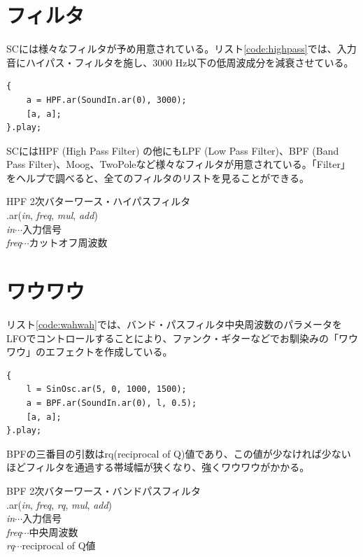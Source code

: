 \documentclass{jsarticle}
\begin{document}
\section{フィルタ}
SCには様々なフィルタが予め用意されている。リスト\ref{code:highpass}では、入力音にハイパス・フィルタを施し、3000 Hz以下の低周波成分を減衰させている。

\begin{lstlisting}[caption=ハイパス・フィルタ, label=code:highpass]
{
	a = HPF.ar(SoundIn.ar(0), 3000);
	[a, a];
}.play;
\end{lstlisting}

SCにはHPF (High Pass Filter) の他にもLPF (Low Pass Filter)、BPF (Band Pass Filter)、Moog、TwoPoleなど様々なフィルタが用意されている。「Filter」をヘルプで調べると、全てのフィルタのリストを見ることができる。

\begin{itembox}[l]{HPF}
{\footnotesize 
2次バターワース・ハイパスフィルタ\\
.ar({\it in}, {\it freq}, {\it mul}, {\it add})\\

{\it in}$\cdots$入力信号\\
{\it freq}$\cdots$カットオフ周波数\\
}
\end{itembox}

\section{ワウワウ}
リスト\ref{code:wahwah}では、バンド・パスフィルタ中央周波数のパラメータをLFOでコントロールすることにより、ファンク・ギターなどでお馴染みの「ワウワウ」のエフェクトを作成している。
\begin{lstlisting}[caption=ワウワウ, label=code:wahwah]
{
	l = SinOsc.ar(5, 0, 1000, 1500);
	a = BPF.ar(SoundIn.ar(0), l, 0.5);
	[a, a];
}.play;
\end{lstlisting}

BPFの三番目の引数はrq(reciprocal of Q)値であり、この値が少なければ少ないほどフィルタを通過する帯域幅が狭くなり、強くワウワウがかかる。

\begin{itembox}[l]{BPF}
{\footnotesize 
2次バターワース・バンドパスフィルタ\\
.ar({\it in}, {\it freq}, {\it rq}, {\it mul}, {\it add})\\

{\it in}$\cdots$入力信号\\
{\it freq}$\cdots$中央周波数\\
{\it rq}$\cdots$reciprocal of Q値\\
}
\end{itembox}
\end{document}
